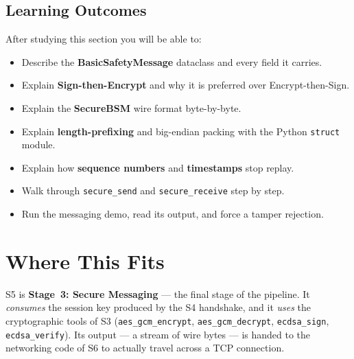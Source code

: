 \documentclass[11pt,a4paper]{report}
\begin{document}
\subsection*{Learning Outcomes}
After studying this section you will be able to:
\begin{itemize}
  \item Describe the \textbf{BasicSafetyMessage} dataclass and every field it carries.
  \item Explain \textbf{Sign-then-Encrypt} and why it is preferred over
        Encrypt-then-Sign.
  \item Explain the \textbf{SecureBSM} wire format byte-by-byte.
  \item Explain \textbf{length-prefixing} and big-endian packing with the
        Python \texttt{struct} module.
  \item Explain how \textbf{sequence numbers} and \textbf{timestamps} stop replay.
  \item Walk through \texttt{secure\_send} and \texttt{secure\_receive} step by step.
  \item Run the messaging demo, read its output, and force a tamper rejection.
\end{itemize}

\section{Where This Fits}

S5 is \textbf{Stage~3: Secure Messaging} --- the final stage of the pipeline. It
\emph{consumes} the session key produced by the S4 handshake, and it \emph{uses}
the cryptographic tools of S3 (\texttt{aes\_gcm\_encrypt}, \texttt{aes\_gcm\_decrypt},
\texttt{ecdsa\_sign}, \texttt{ecdsa\_verify}). Its output --- a stream of wire
bytes --- is handed to the networking code of S6 to actually travel across a TCP
connection.
\end{document}
